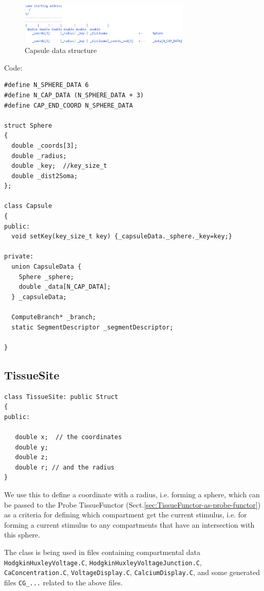 \begin{figure}[hbtp]
  \centerline{\includegraphics[height=2cm,
    angle=0]{./images/NTS_Capsule.eps}}
\caption{Capsule data structure}
\label{fig:NTS_Capsule}
\end{figure}


Code:
{\small
\begin{lstlisting}
#define N_SPHERE_DATA 6
#define N_CAP_DATA (N_SPHERE_DATA + 3)
#define CAP_END_COORD N_SPHERE_DATA

struct Sphere
{
  double _coords[3];
  double _radius;
  double _key;  //key_size_t
  double _dist2Soma;
};

class Capsule
{
public:
  void setKey(key_size_t key) {_capsuleData._sphere._key=key;}

private:
  union CapsuleData {
    Sphere _sphere;
    double _data[N_CAP_DATA];
  } _capsuleData;
 
  ComputeBranch* _branch;
  static SegmentDescriptor _segmentDescriptor;
  
}
\end{lstlisting}
}

\subsection{TissueSite}
\label{sec:TissueSite}

\begin{lstlisting}
class TissueSite: public Struct
{
public:

   double x;  // the coordinates
   double y;
   double z;
   double r; // and the radius
}
\end{lstlisting}

We use this to define a coordinate with a radius, i.e. forming a sphere, which
can be passed to the Probe TissueFunctor
(Sect.\ref{sec:TissueFunctor-as-probe-functor}) as a criteria for defining
which compartment get the current stimulus, i.e. for forming a current stimulus
to any compartments that have an intersection with this sphere.

The class is being used in files containing compartmental data
\verb!HodgkinHuxleyVoltage.C!, \verb!HodgkinHuxleyVoltageJunction.C!,
\verb!CaConcentration.C!, \verb!VoltageDisplay.C!, \verb!CalciumDisplay.C!, and
some generated files \verb!CG_...! related to the above files.




